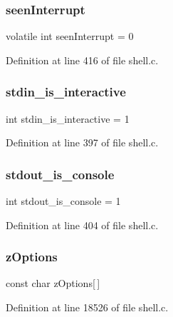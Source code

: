 \subsubsection{seen\+Interrupt}
{\footnotesize\ttfamily volatile int seen\+Interrupt = 0\hspace{0.3cm}{\ttfamily [static]}}



Definition at line 416 of file shell.\+c.

\mbox{\label{shell_8c_a55c1a0a7491e69398c3db400d86ab455}} 
\subsubsection{stdin\+\_\+is\+\_\+interactive}
{\footnotesize\ttfamily int stdin\+\_\+is\+\_\+interactive = 1\hspace{0.3cm}{\ttfamily [static]}}



Definition at line 397 of file shell.\+c.

\mbox{\label{shell_8c_a022ffe09bf337d9973cfd0bdc9b53d4a}} 
\subsubsection{stdout\+\_\+is\+\_\+console}
{\footnotesize\ttfamily int stdout\+\_\+is\+\_\+console = 1\hspace{0.3cm}{\ttfamily [static]}}



Definition at line 404 of file shell.\+c.

\mbox{\label{shell_8c_a7ae41c1716e5067e8d40df0cc6654b1e}} 
\subsubsection{z\+Options}
{\footnotesize\ttfamily const char z\+Options[$\,$]\hspace{0.3cm}{\ttfamily [static]}}



Definition at line 18526 of file shell.\+c.

